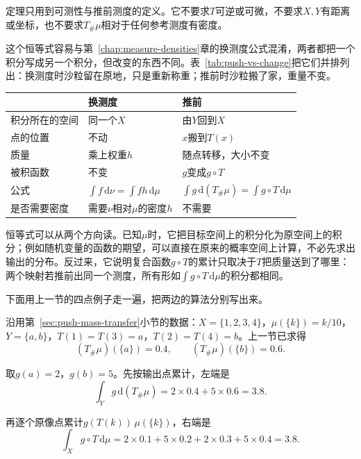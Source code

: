 定理只用到可测性与推前测度的定义。它不要求$T$可逆或可微，不要求$X,Y$有距离或坐标，也不要求$T_\#\mu$相对于任何参考测度有密度。

这个恒等式容易与第~\ref{chap:measure-densities}章的换测度公式混淆，两者都把一个积分写成另一个积分，但改变的东西不同。表~\ref{tab:push-vs-change}把它们并排列出：换测度时沙粒留在原地，只是重新称重；推前时沙粒搬了家，重量不变。

\begin{BookInlineTable}
  \centering
  \begin{tabular}{@{}lll@{}}
    \toprule
    & 换测度 & 推前\\
    \midrule
    积分所在的空间 & 同一个$X$ & 由$Y$回到$X$\\
    点的位置 & 不动 & $x$搬到$T(x)$\\
    质量 & 乘上权重$h$ & 随点转移，大小不变\\
    被积函数 & 不变 & $g$变成$g\circ T$\\
    公式 & $\int f\,\mathrm d\nu=\int fh\,\mathrm d\mu$ & $\int g\,\mathrm d(T_\#\mu)=\int g\circ T\,\mathrm d\mu$\\
    是否需要密度 & 需要$\nu$相对$\mu$的密度$h$ & 不需要\\
    \bottomrule
  \end{tabular}
  \caption{换测度公式与推前积分恒等式的对照。}
  \label{tab:push-vs-change}
\end{BookInlineTable}

恒等式可以从两个方向读。已知$\mu$时，它把目标空间上的积分化为原空间上的积分；例如随机变量的函数的期望，可以直接在原来的概率空间上计算，不必先求出输出的分布。反过来，它说明复合函数$g\circ T$的累计只取决于$T$把质量送到了哪里：两个映射若推前出同一个测度，所有形如$\int g\circ T\,\mathrm d\mu$的积分都相同。

下面用上一节的四点例子走一遍，把两边的算法分别写出来。

\begin{example}[有限集合上的分组汇总]
\label{ex:push-finite-sum}
沿用第~\ref{sec:push-mass-transfer}小节的数据：$X=\{1,2,3,4\}$，$\mu(\{k\})=k/10$，$Y=\{a,b\}$，$T(1)=T(3)=a$，$T(2)=T(4)=b$。上一节已求得
\[
(T_\#\mu)(\{a\})=0.4,\qquad(T_\#\mu)(\{b\})=0.6.
\]

取$g(a)=2$，$g(b)=5$。先按输出点累计，左端是
\[
\int_Yg\,\mathrm d(T_\#\mu)=2\times0.4+5\times0.6=3.8 .
\]

再逐个原像点累计$g(T(k))\,\mu(\{k\})$，右端是
\[
\int_Xg\circ T\,\mathrm d\mu=2\times0.1+5\times0.2+2\times0.3+5\times0.4=3.8 .
\]
\end{example}

